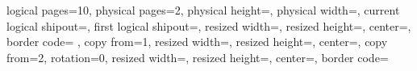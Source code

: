 {%
  \pgfpagesphysicalpageoptions%
  {%
    logical pages=10,%
    physical pages=2,%
    physical height=\pgfpageoptionheight,%
    physical width=\pgfpageoptionwidth,%
    current logical shipout=\pgfpageoptionfirstshipout,%
    first logical shipout=\pgfpageoptionfirstshipout,%
  }
  {%
    resized width=\pgfphysicalwidth,%
    resized height=\pgfphysicalheight,%
    center=\pgfpoint{.5\pgfphysicalwidth}{.5\pgfphysicalheight},%
    border code={%
        \color{gray!50}\pgfsetlinewidth{0.25pt}%
        \pgfsetdash{{10pt}{5pt}}{0pt}%
        \color{black}%
        \pgfsetdash{}{0pt}%
      },%
    copy from=1,%
  }%
  {%
    resized width=\pgfphysicalwidth,%
    resized height=\pgfphysicalheight,%
    center=\pgfpoint{.5\pgfphysicalwidth}{.5\pgfphysicalheight},%
    copy from=2,%
  }%
  {%
    rotation=0,%
    resized width=\resizedwidth,%
    resized height=\resizedheight,%
    center=\pgfpoint{.25\pgfphysicalwidth+.5\printermarginx}{.75\pgfphysicalheight-.5\printermarginy},%
    border code={%
        \color{gray!50}\pgfsetlinewidth{.75pt}%
        \pgfsetdash{{20pt}{10pt}}{0pt}%
        \pgfpathmoveto{\pgfpoint{0pt}{0pt}}%
        \color{black}%
        \pgfsetdash{}{0pt}%
}}}

